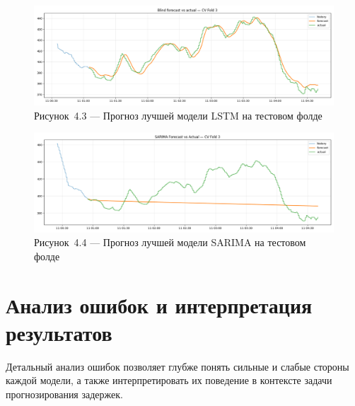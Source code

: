 \begin{figure}[H]
	\centering
	\includegraphics[width=\textwidth]{figures/chapter4/lstm_forecast.png}
	\caption*{Рисунок~4.3 — Прогноз лучшей модели LSTM на тестовом фолде}
	\label{fig:lstm_forecast}
\end{figure}

\begin{figure}[H]
	\centering
	\includegraphics[width=\textwidth]{figures/chapter4/sarima_forecast.png}
	\caption*{Рисунок~4.4 — Прогноз лучшей модели SARIMA на тестовом фолде}
	\label{fig:sarima_forecast}
\end{figure}

\section{Анализ ошибок и интерпретация результатов}
\label{sec:error_analysis}

\hspace*{1.25cm}Детальный анализ ошибок позволяет глубже понять сильные и слабые стороны каждой модели, а также интерпретировать их поведение в контексте задачи прогнозирования задержек.

